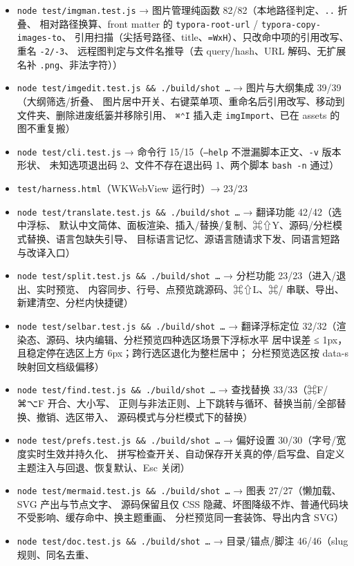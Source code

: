 \documentclass[11pt,a4paper]{ctexart}
\begin{document}
\begin{itemize}
\item \texttt{node test/imgman.test.js} → 图片管理纯函数 82/82（本地路径判定、\texttt{..} 折叠、
相对路径换算、front matter 的 \texttt{typora-root-url} / \texttt{typora-copy-images-to}、
引用扫描（尖括号路径、title、\texttt{=WxH}）、只改命中项的引用改写、重名 \texttt{-2/-3}、
远程图判定与文件名推导（去 query/hash、URL 解码、无扩展名补 \texttt{.png}、非法字符））
\item \texttt{node test/imgedit.test.js \&\& ./build/shot …} → 图片与大纲集成 39/39（大纲筛选/折叠、
图片居中开关、右键菜单项、重命名后引用改写、移动到文件夹、删除进废纸篓并移除引用、
\texttt{⌘⌃I} 插入走 \texttt{imgImport}、已在 assets 的图不重复搬）
\item \texttt{node test/cli.test.js} → 命令行 15/15（\texttt{--help} 不泄漏脚本正文、\texttt{-v} 版本形状、
未知选项退出码 2、文件不存在退出码 1、两个脚本 \texttt{bash -n} 通过）
\item \texttt{test/harness.html}（WKWebView 运行时）→ 23/23
\item \texttt{node test/translate.test.js \&\& ./build/shot …} → 翻译功能 42/42（选中浮标、
默认中文简体、面板渲染、插入/替换/复制、⌘⇧Y、源码/分栏模式替换、语言包缺失引导、
目标语言记忆、源语言随请求下发、同语言短路与改译入口）
\item \texttt{node test/split.test.js \&\& ./build/shot …} → 分栏功能 23/23（进入/退出、实时预览、
内容同步、行号、点预览跳源码、⌘⇧L、⌘/ 串联、导出、新建清空、分栏内快捷键）
\item \texttt{node test/selbar.test.js \&\& ./build/shot …} → 翻译浮标定位 32/32（渲染态、源码、块内编辑、分栏预览四种选区场景下浮标水平
居中误差 ≤ 1px，且稳定停在选区上方 6px；跨行选区退化为整栏居中；
分栏预览选区按 data-s 映射回文档级偏移）
\item \texttt{node test/find.test.js \&\& ./build/shot …} → 查找替换 33/33（⌘F/⌘⌥F 开合、大小写、
正则与非法正则、上下跳转与循环、替换当前/全部替换、撤销、选区带入、
源码模式与分栏模式下的替换）
\item \texttt{node test/prefs.test.js \&\& ./build/shot …} → 偏好设置 30/30（字号/宽度实时生效并持久化、
拼写检查开关、自动保存开关真的停/启写盘、自定义主题注入与回退、恢复默认、Esc 关闭）
\item \texttt{node test/mermaid.test.js \&\& ./build/shot …} → 图表 27/27（懒加载、SVG 产出与节点文字、
源码保留且仅 CSS 隐藏、坏图降级不炸、普通代码块不受影响、缓存命中、换主题重画、
分栏预览同一套装饰、导出内含 SVG）
\item \texttt{node test/doc.test.js \&\& ./build/shot …} → 目录/锚点/脚注 46/46（slug 规则、同名去重、

\end{itemize}
\end{document}
